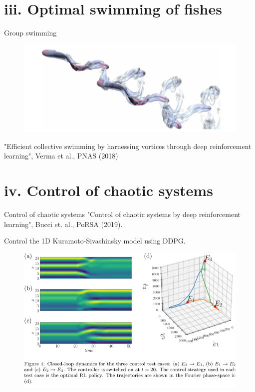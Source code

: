 \documentclass{beamer}
\begin{document}
\section{iii. Optimal swimming of fishes}

\begin{frame}{Group swimming}
    \begin{figure}
    \begin{center}
      \includegraphics[width=.95\textwidth]{Figures/fish_article2} \\
    \end{center}
    \end{figure}

"Efficient collective swimming by harnessing vortices through deep reinforcement learning", Verma et al., PNAS (2018)
\end{frame}

\section{iv. Control of chaotic systems}



\begin{frame}{Control of chaotic systems}
"Control of chaotic systems by deep reinforcement learning", Bucci et. al., PoRSA (2019).

Control the 1D Kuramoto-Sivashinsky model using DDPG.

\begin{figure}
    \begin{center}
      \includegraphics[width=.75\textwidth]{Figures/ControlChaoticSystemsIllustration}
    \end{center}
    \end{figure}

\end{frame}
\end{document}
